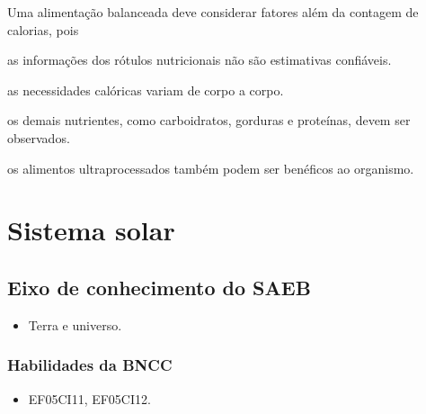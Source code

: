 Uma alimentação balanceada deve considerar fatores além da contagem de
calorias, pois

\begin{escolha}
\item as informações dos rótulos nutricionais não são estimativas confiáveis.

\item as necessidades calóricas variam de corpo a corpo.

\item os demais nutrientes, como carboidratos, gorduras e proteínas, devem ser observados.

\item os alimentos ultraprocessados também podem ser benéficos ao organismo.
\end{escolha}



\chapter{Sistema solar}

\section*{Eixo de conhecimento do SAEB}

\begin{itemize}
	\item Terra e universo.
\end{itemize}

\subsection{Habilidades da BNCC}

\begin{itemize}
\item EF05CI11, EF05CI12.
\end{itemize}


